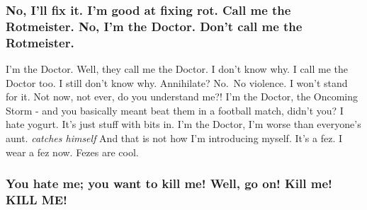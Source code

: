 \hypertarget{no-ill-fix-it.-im-good-at-fixing-rot.-call-me-the-rotmeister.-no-im-the-doctor.-dont-call-me-the-rotmeister.}{%
\subsubsection{No, I'll fix it. I'm good at fixing rot. Call me the
Rotmeister. No, I'm the Doctor. Don't call me the
Rotmeister.}\label{no-ill-fix-it.-im-good-at-fixing-rot.-call-me-the-rotmeister.-no-im-the-doctor.-dont-call-me-the-rotmeister.}}

I'm the Doctor. Well, they call me the Doctor. I don't know why. I call
me the Doctor too. I still don't know why. Annihilate? No.~No violence.
I won't stand for it. Not now, not ever, do you understand me?! I'm the
Doctor, the Oncoming Storm - and you basically meant beat them in a
football match, didn't you? I hate yogurt. It's just stuff with bits in.
I'm the Doctor, I'm worse than everyone's aunt. \emph{catches himself}
And that is not how I'm introducing myself. It's a fez. I wear a fez
now. Fezes are cool.

\hypertarget{you-hate-me-you-want-to-kill-me-well-go-on-kill-me-kill-me}{%
\subsubsection{You hate me; you want to kill me! Well, go on! Kill me!
KILL
ME!}\label{you-hate-me-you-want-to-kill-me-well-go-on-kill-me-kill-me}}

